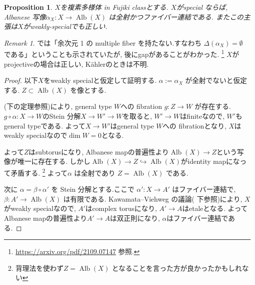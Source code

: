 \documentclass[dvipdfmx,a4paper,11pt]{article} %
\newtheorem{prop}[thm]{Proposition}
\theoremstyle{definition}
\theoremstyle{remark}
\newtheorem{rem}[thm]{Remark}
\numberwithin{equation}{section}
\begin{document}
\begin{prop}\cite[Proposition 5.3]{Cam04}
\label{prop-Cam04-5.3}
$X$を複素多様体 in Fujiki classとする. 
$X$がspecial ならば,  Albanese 写像\( \alpha_X : X \to \operatorname{Alb}(X) \) は全射かつファイバー連結である. 
またこの主張は$X$がweakly-specialでも正しい. 
\end{prop}
\begin{rem}
\cite[Propsition 5.3]{Cam04}では「余次元 1 の multiple fiber を持たない.すなわち \( \Delta(\alpha_X)=\emptyset \) である」ということも示されていたが, 後にgapがあることがわかった. \footnote{\url{https://arxiv.org/pdf/2109.07147} 参照. }
$X$がprojectiveの場合は正しい, K\"ahlerのときは不明. 
\end{rem}

\begin{proof}
以下$X$をweakly specialと仮定して証明する. 
 \( \alpha:=\alpha_X \) が全射でないと仮定する.
 \( Z\subset \operatorname{Alb}(X) \) を像とする.
 
  \cite[Theorem 10.9]{Uen75}(下の定理参照)により, general type $W$への fibration \( g : Z \to W\) が存在する.  $g\circ\alpha : X \to W$のStein 分解$X \to W' \to W$を取ると, $W' \to W$はfiniteなので, $W'$もgeneral typeである. 
  よって$X \to W'$はgeneral type $W$への fibrationとなり, $X$はweakly specialなので$\dim W=0$となる. 
  
 よって$Z$はsubtorusになり, Albanese mapの普遍性より$\operatorname{Alb}(X) \to Z$という写像が唯一に存在する. しかし$\operatorname{Alb}(X) \to Z \hookrightarrow \operatorname{Alb}(X)$がidentity mapになって矛盾する.
 \footnote{背理法を使わず\( Z=\operatorname{Alb}(X) \) となることを言った方が良かったかもしれない}
よって\( \alpha \) は全射であり \( Z=\operatorname{Alb}(X) \) である.

次に \( \alpha=\beta\circ \alpha' \) を Stein 分解とする.ここで \( \alpha' : X\to A' \) はファイバー連結で, \( \beta : A' \to \operatorname{Alb}(X) \) は有限である.
Kawamata--Viehweg の議論(\cite[Proposition 4.1]{Wang21} 下参照)により, $X$がweakly specialなので, 
$A'$はcomplex torusになり, $A' \to A$はetaleとなる. 
よってAlbanese mapの普遍性より$A' \to A$は双正則になり, $\alpha$はファイバー連結である. 
\end{proof}
\end{document}
